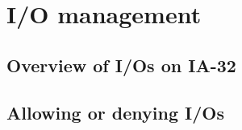 
%
%

\chapter{I/O management}

%
%

\section{Overview of I/Os on IA-32}

%
%

\section{Allowing or denying I/Os}
